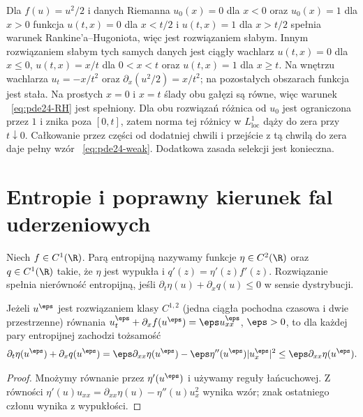 \begin{kontrprzyklad}
\label{ex:pde24-expansion}
Dla $f(u)=u^2/2$ i danych Riemanna $u_0(x)=0$ dla $x<0$
oraz $u_0(x)=1$ dla $x>0$ funkcja
$u(t,x)=0$ dla $x<t/2$ i $u(t,x)=1$ dla $x>t/2$
spełnia warunek Rankine'a--Hugoniota, więc jest rozwiązaniem
słabym. Innym rozwiązaniem słabym tych samych danych jest
ciągły wachlarz $u(t,x)=0$ dla $x\le0$,
$u(t,x)=x/t$ dla $0<x<t$ oraz $u(t,x)=1$ dla $x\ge t$.
Na wnętrzu wachlarza $u_t=-x/t^2$ oraz
$\partial_x(u^2/2)=x/t^2$; na pozostałych
obszarach funkcja jest stała. Na prostych $x=0$ i
$x=t$ ślady obu gałęzi są równe, więc warunek
~\eqref{eq:pde24-RH} jest spełniony. Dla obu
rozwiązań różnica od $u_0$ jest ograniczona przez
$1$ i znika poza $[0,t]$, zatem norma tej różnicy
w $L^1_{\mathrm{loc}}$ dąży do zera przy $t\downarrow0$.
Całkowanie przez części od dodatniej chwili i przejście
z tą chwilą do zera daje pełny wzór
~\eqref{eq:pde24-weak}. Dodatkowa zasada selekcji
jest konieczna.
\end{kontrprzyklad}

\section{Entropie i poprawny kierunek fal uderzeniowych}
\begin{definicja}
Niech $f\in C^1(\R)$. Parą entropijną nazywamy funkcje
$\eta\in C^2(\R)$ oraz $q\in C^1(\R)$ takie, że $\eta$ jest
wypukła i $q'(z)=\eta'(z)f'(z)$. Rozwiązanie spełnia
nierówność entropijną, jeśli
$\partial_t\eta(u)+\partial_x q(u)\le0$ w sensie dystrybucji.
\end{definicja}

\begin{lemat}
\label{lem:pde24-viscentropy}
Jeżeli $u^\eps$ jest rozwiązaniem klasy $C^{1,2}$
(jedna ciągła pochodna czasowa i dwie przestrzenne)
równania $u_t^\eps+\partial_xf(u^\eps)=\eps u_{xx}^\eps$,
$\eps>0$, to dla każdej pary entropijnej zachodzi tożsamość
\begin{equation}\label{eq:pde24-entropyvisc}
 \partial_t\eta(u^\eps)+\partial_xq(u^\eps)
 =\eps\partial_{xx}\eta(u^\eps)
 -\eps\eta''(u^\eps)|u_x^\eps|^2
 \le\eps\partial_{xx}\eta(u^\eps).
\end{equation}
\end{lemat}
\begin{proof}
Mnożymy równanie przez $\eta'(u^\eps)$ i używamy reguły
łańcuchowej. Z równości
$\eta'(u)u_{xx}=\partial_{xx}\eta(u)-\eta''(u)u_x^2$
wynika wzór; znak ostatniego członu wynika z wypukłości.
\end{proof}

